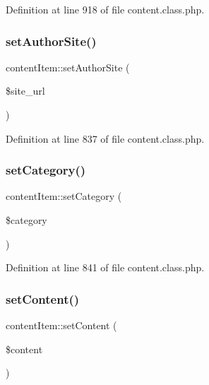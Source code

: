 Definition at line 918 of file content.\+class.\+php.

\hypertarget{classcontentItem_af28f4f40f1ac95cee2d88fe1e7d4b683}{}\label{classcontentItem_af28f4f40f1ac95cee2d88fe1e7d4b683} 
\subsubsection{\texorpdfstring{set\+Author\+Site()}{setAuthorSite()}}
{\footnotesize\ttfamily content\+Item\+::set\+Author\+Site (\begin{DoxyParamCaption}\item[{}]{\$site\+\_\+url }\end{DoxyParamCaption})}



Definition at line 837 of file content.\+class.\+php.

\hypertarget{classcontentItem_aa8ba578ae6629d632a42a76da823c59f}{}\label{classcontentItem_aa8ba578ae6629d632a42a76da823c59f} 
\subsubsection{\texorpdfstring{set\+Category()}{setCategory()}}
{\footnotesize\ttfamily content\+Item\+::set\+Category (\begin{DoxyParamCaption}\item[{}]{\$category }\end{DoxyParamCaption})}



Definition at line 841 of file content.\+class.\+php.

\hypertarget{classcontentItem_ad7355ad724398f4fbc79832241767405}{}\label{classcontentItem_ad7355ad724398f4fbc79832241767405} 
\subsubsection{\texorpdfstring{set\+Content()}{setContent()}}
{\footnotesize\ttfamily content\+Item\+::set\+Content (\begin{DoxyParamCaption}\item[{}]{\$content }\end{DoxyParamCaption})}



